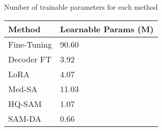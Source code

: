 \begin{margintable}[]\small
\caption{Number of trainable parameters for each method}
\label{tab:trainable_params}
\begin{tabular}{@{}lP{20mm}@{}}
\toprule
\textbf{Method}       & \textbf{Learnable  Params (M)}\\ \midrule
Fine-Tuning                         & 90.60     \\
Decoder FT                          & 3.92      \\
LoRA~\cite{hu2022lora}              & 4.07      \\
Med-SA~\cite{wu2023medical}         & 11.03     \\
HQ-SAM~\cite{ke2024segment}         & 1.07      \\
SAM-DA                              & 0.66      \\ \bottomrule
\end{tabular}
\end{margintable}